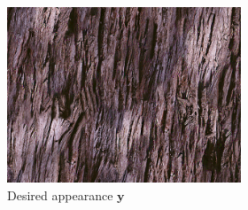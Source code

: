 \begin{figure}[]
    \begin{subfigure}{\textwidth}
        \centering
        \begin{subfigure}{0.2\textwidth}
            \centering
            \includegraphics[width=\textwidth]{images/04-experiment02/photo/wood/target.jpg}
            \caption*{Desired appearance \(\bm{y}\)}
        \end{subfigure}
        \hfill
        \begin{subfigure}{0.78\textwidth}
            \centering
            \begin{subfigure}{0.32\textwidth}
                \centering
\end{subfigure}
\end{subfigure}
\end{subfigure}
\end{figure}
